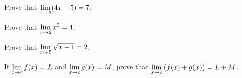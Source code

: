 \newpage

\begin{example}
Prove that $\displaystyle\lim_{x\to 3}(4x-5)=7$.
\end{example}

\newpage

\begin{example}
Prove that $\displaystyle\lim_{x\to 2}x^2=4$.
\end{example}

\newpage

\begin{example}
Prove that $\displaystyle\lim_{x\to 5}\sqrt{x-1} = 2$.
\end{example}

\newpage

\begin{example}
If $\displaystyle\lim_{x\to c}f(x) = L$ and $\displaystyle\lim_{x\to c}g(x) = M$, prove that $\displaystyle\lim_{x\to c}\big(f(x)+g(x)\big) = L+ M$.
\end{example}

